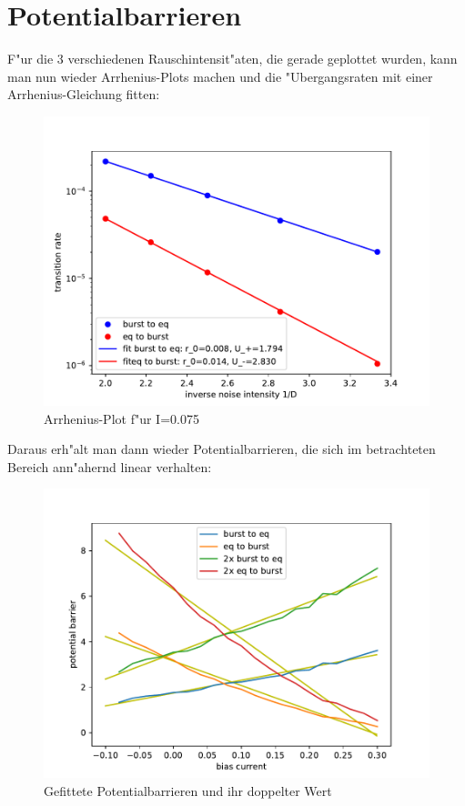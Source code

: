 \documentclass[12pt,a4paper]{article}
\begin{document}
\section{Potentialbarrieren}
F"ur die 3 verschiedenen Rauschintensit"aten, die gerade geplottet wurden, kann man nun wieder Arrhenius-Plots machen und die "Ubergangsraten mit einer Arrhenius-Gleichung fitten:
\begin{figure}[H]
	\centering
	\includegraphics[scale=0.9]{arrheniustotnewrealfast11jjem2shnewrealfast19jjem2stfit5.pdf}
	\caption{Arrhenius-Plot f"ur I=0.075}
	\label{arrh}
\end{figure}
Daraus erh"alt man dann wieder Potentialbarrieren, die sich im betrachteten Bereich ann"ahernd linear verhalten:
\begin{figure}[H]
	\centering
	\includegraphics[scale=0.9]{barriercompnewrealfast11jjem2shnewrealfast19jjem2st.pdf}
	\caption{Gefittete Potentialbarrieren und ihr doppelter Wert}
	\label{potbar}
\end{figure}
\end{document}

